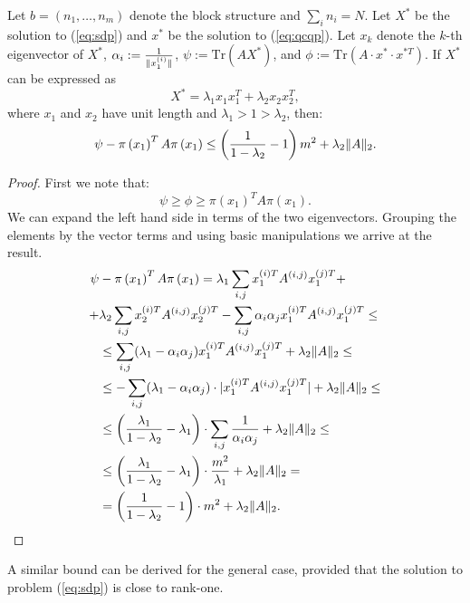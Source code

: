 %
\begin{proposition}\label{thm:rank2sdp_solution}
Let $b = \left(n_1,\ldots,n_m\right)$ denote the block structure and $ \sum_i n_i = N $.
Let $X^*$ be the solution to (\ref{eq:sdp}) and $x^{*}$ be the solution to  (\ref{eq:qcqp}).
Let $x_k$ denote the $k$-th eigenvector of $X^*$, $\alpha_i := \frac{1}{\lVert x_1^{(i)}\rVert}$,
$\psi := \mathrm{Tr}\left(A X^{*}\right)$, and $\phi := \mathrm{Tr}\left(A \cdot x^{*} \cdot x^{*T}\right)$.
If $X^*$ can be expressed as
$$X^* = \lambda_1  x_1 x_1^T + \lambda_2 x_2 x_2^T,$$
where $x_1$ and $x_2$ have unit length and $\lambda_1 > 1 >  \lambda_2$,
 then: $$\psi - \pi\left(x_1\right)^T A \pi\left(x_1\right) \leq  \left(\frac{1}{1-\lambda_2} -1\right)  m^2 + \lambda_2 \lVert A\rVert_2.$$
\end{proposition}
%
\begin{proof}
First we note that: $$\psi \geq \phi \geq \pi\left(x_1\right)^T A \pi\left(x_1\right).$$ We can expand the left hand side in terms of the two eigenvectors. Grouping the elements by the vector terms and using basic manipulations we arrive at the result.
\begin{align*}
\psi &- \pi\left(x_1\right)^T A \pi\left(x_1\right) = \lambda_1 \sum_{i,j} x_1^{(i)T} A^{(i,j)} x_1^{(j)T}  + \\
+ &\lambda_2\sum_{i,j} x_2^{(i)T} A^{(i,j)} x_2^{(j)T} - \sum_{i,j} \alpha_i \alpha_j x_1^{(i)T} A^{(i,j)} x_1^{(j)T}  \leq \\
&\leq  \sum_{i,j} (\lambda_1 - \alpha_i \alpha_j) x_1^{(i)T} A^{(i,j)} x_1^{(j)T}  + \lambda_2 \lVert A\rVert_2 \leq\\
&\leq -\sum_{i,j} (\lambda_1 - \alpha_i \alpha_j)\cdot |x_1^{(i)T} A^{(i,j)} x_1^{(j)T}| +  \lambda_2 \lVert A\rVert_2 \leq\\
&\leq \left(\frac{\lambda_1}{1-\lambda_2} - \lambda_1 \right)\cdot \sum_{i,j}  \frac{1}{\alpha_i \alpha_j} +  \lambda_2 \lVert A\rVert_2 \leq\\
&\leq \left(\frac{\lambda_1}{1-\lambda_2} - \lambda_1 \right)\cdot \frac{m^2}{\lambda_1} +  \lambda_2 \lVert A\rVert_2 =\\
&= \left(\frac{1}{1-\lambda_2} - 1 \right)\cdot m^2 +  \lambda_2 \lVert A\rVert_2.
\end{align*}
\end{proof}
%
A similar bound can be derived for the general case, provided that the solution to problem (\ref{eq:sdp}) is close to rank-one.
